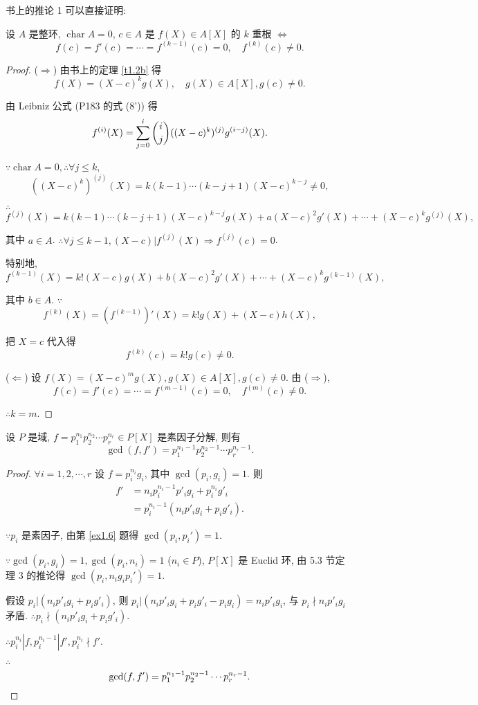 \documentclass[UTF8]{ctexart}
\begin{document}
书上的推论 1 可以直接证明:
\begin{theorem}[书上的推论 1]
    设 $A$ 是整环, $\operatorname{char}A=0$, $c\in A$ 是 $f(X)\in A[X]$ 的 $k$ 重根 $\Leftrightarrow$
    \[f(c)=f'(c)=\cdots=f^{(k-1)}(c)=0,\quad f^{(k)}(c)\neq0.\]
\end{theorem}
\begin{proof}
    ($\Rightarrow$) 由书上的定理 \ref{t1.2b} 得
    \[f(X)=(X-c)^kg(X),\quad g(X)\in A[X],g(c)\neq0.\]

    由 Leibniz 公式 (P183 的式 (8')) 得
    \[f^{(i)}(X)=\sum\limits_{j=0}^i\dbinom{i}{j}((X-c)^k)^{(j)}g^{(i-j)}(X).\]

    $\because\operatorname{char}A=0,\therefore\forall j\leq k$,
    \[((X-c)^k)^{(j)}(X)=k(k-1)\cdots(k-j+1)(X-c)^{k-j}\neq0,\]

    $\therefore$
    \[f^{(j)}(X)=k(k-1)\cdots(k-j+1)(X-c)^{k-j}g(X)+a(X-c)^2g'(X)+\cdots+(X-c)^kg^{(j)}(X),\]

    其中 $a\in A$.
    $\therefore\forall j\leq k-1,(X-c)|f^{(j)}(X)\Rightarrow f^{(j)}(c)=0$.

    特别地,
    \[f^{(k-1)}(X)=k!(X-c)g(X)+b(X-c)^2g'(X)+\cdots+(X-c)^kg^{(k-1)}(X),\]

    其中 $b\in A$. $\because$
    \[f^{(k)}(X)=(f^{(k-1)})'(X)=k!g(X)+(X-c)h(X),\]

    把 $X=c$ 代入得
    \[f^{(k)}(c)=k!g(c)\neq0.\]

    ($\Leftarrow$) 设 $f(X)=(X-c)^mg(X),g(X)\in A[X],g(c)\neq0$. 由 ($\Rightarrow$),
    \[f(c)=f'(c)=\cdots=f^{(m-1)}(c)=0,\quad f^{(m)}(c)\neq0.\]

    $\therefore k=m$.
\end{proof}
\begin{theorem}[书上的推论 2]
    设 $P$ 是域, $f=p_1^{n_1}p_2^{n_2}\cdots p_r^{n_r}\in P[X]$ 是素因子分解, 则有
    \[\gcd(f,f')=p_1^{n_1-1}p_2^{n_2-1}\cdots p_r^{n_r-1}.\]
\end{theorem}
\begin{proof}
    $\forall i=1,2,\cdots,r$ 设 $f=p_i^{n_i}g_i$, 其中 $\gcd(p_i,g_i)=1$. 则
    \begin{align*}
        f' & =n_ip_i^{n_i-1}p'_ig_i+p_i^{n_i}g'_i \\
        & =p_i^{n_i-1}(n_ip'_ig_i+p_ig'_i).
    \end{align*}

    $\because p_i$ 是素因子, 由第 \ref{ex1.6} 题得 $\gcd(p_i,p_i')=1$.

    $\because\gcd(p_i,g_i)=1,\gcd(p_i,n_i)=1$ ($n_i\in P$), $P[X]$ 是 Euclid 环, 由 5.3 节定理 3 的推论得 $\gcd(p_i,n_ig_ip_i')=1$.

    假设 $p_i|(n_ip'_ig_i+p_ig'_i)$, 则 $p_i|(n_ip'_ig_i+p_ig'_i-p_ig_i)=n_ip'_ig_i$, 与 $p_i\nmid n_ip'_ig_i$ 矛盾. $\therefore p_i\nmid(n_ip'_ig_i+p_ig'_i)$.

    $\therefore p_i^{n_i}|f,p_i^{n_i-1}|f',p_i^{n_i}\nmid f'$.

    $\therefore$
    \[\gcd(f,f')=p_1^{n_1-1}p_2^{n_2-1}\cdots p_r^{n_r-1}.\qedhere\]
\end{proof}
\end{document}
